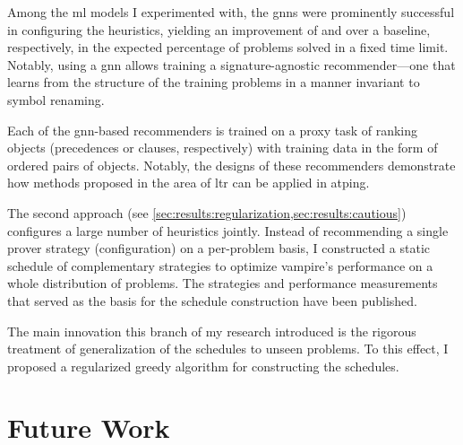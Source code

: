 Among the \gls{ml} models I experimented with,
the \glspl{gnn} were prominently successful in configuring the heuristics,
yielding an improvement of  and  over a baseline, respectively, in the expected percentage of problems solved in a fixed time limit.
Notably, using a \gls{gnn} allows training a signature-agnostic recommender---one that learns from the structure of the training problems in a manner invariant to symbol renaming.

Each of the \acrshort{gnn}-based recommenders is trained on a proxy task of ranking objects (precedences or clauses, respectively)
with training data in the form of ordered pairs of objects.
Notably, the designs of these recommenders demonstrate how methods proposed in the area of \acrlong{ltr}
can be applied in \gls{atping}.

The second approach (see \cref{sec:results:regularization,sec:results:cautious}) configures a large number of heuristics jointly.
Instead of recommending a single prover strategy (configuration) on a per-problem basis,
I constructed a static schedule of complementary strategies to optimize \gls{vampire}'s performance on a whole distribution of problems.
The strategies and performance measurements that served as the basis for the schedule construction have been published.

\pagebreak

The main innovation this branch of my research introduced is the rigorous treatment of generalization of the schedules to unseen problems.
To this effect, I proposed a regularized greedy algorithm for constructing the schedules.


\section{Future Work}

